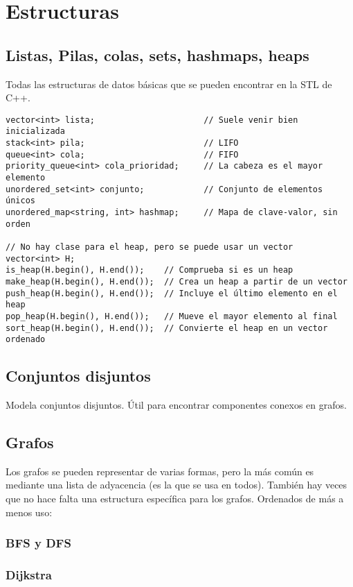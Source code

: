 \chapter{Estructuras}
\section{Listas, Pilas, colas, sets, hashmaps, heaps}
Todas las estructuras de datos básicas que se pueden encontrar en la STL de C++.

\begin{lstlisting}
vector<int> lista;                      // Suele venir bien inicializada
stack<int> pila;                        // LIFO
queue<int> cola;                        // FIFO
priority_queue<int> cola_prioridad;     // La cabeza es el mayor elemento
unordered_set<int> conjunto;            // Conjunto de elementos únicos
unordered_map<string, int> hashmap;     // Mapa de clave-valor, sin orden

// No hay clase para el heap, pero se puede usar un vector
vector<int> H;
is_heap(H.begin(), H.end());    // Comprueba si es un heap
make_heap(H.begin(), H.end());  // Crea un heap a partir de un vector
push_heap(H.begin(), H.end());  // Incluye el último elemento en el heap
pop_heap(H.begin(), H.end());   // Mueve el mayor elemento al final
sort_heap(H.begin(), H.end());  // Convierte el heap en un vector ordenado
\end{lstlisting}

\section{Conjuntos disjuntos}
Modela conjuntos disjuntos. Útil para encontrar componentes conexos en grafos.


\section{Grafos}
Los grafos se pueden representar de varias formas, pero la más común es mediante
una lista de adyacencia (es la que se usa en todos). También hay veces que no
hace falta una estructura específica para los grafos. Ordenados de más a menos
uso:

\subsection{BFS y DFS}

\subsection{Dijkstra}
